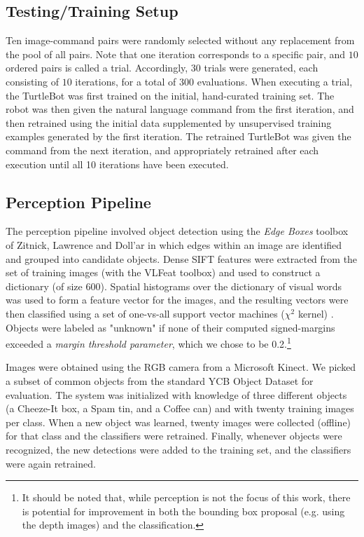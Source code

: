 \subsection{Testing/Training Setup}
Ten image-command pairs were randomly selected without any replacement from the pool of all pairs.
Note that one iteration corresponds to a specific pair, and $10$ ordered pairs is called a trial. 
Accordingly, $30$ trials were generated, each consisting of $10$ iterations, for a total of $300$ evaluations.
When executing a trial, the TurtleBot was first trained on the initial, hand-curated training set.
The robot was then given the natural language command from the first iteration, and then retrained using the initial data supplemented by unsupervised training examples generated by the first iteration.
The retrained TurtleBot was given the command from the next iteration, and appropriately retrained after each execution until all 10 iterations have been executed.

\subsection{Perception Pipeline}
The perception pipeline involved object detection using the \emph{Edge Boxes} toolbox of Zitnick, Lawrence and Doll{'a}r \cite{zitnick2014edge} in which edges within an image are identified and grouped into candidate objects. Dense SIFT features \cite{bosch2007image} were extracted from the set of training images (with the VLFeat \cite{vedaldi2010vlfeat} toolbox) and used to construct a dictionary (of size 600). Spatial histograms over the dictionary of visual words was used to form a feature vector for the images, and the resulting vectors were then classified using a set of one-vs-all support vector machines ($\chi^2$ kernel) \cite{fan2008liblinear}. Objects were labeled as "unknown" if none of their computed signed-margins exceeded a \emph{margin threshold parameter}, which we chose to be 0.2.\footnote{It should be noted that, while perception is not the focus of this work, there is potential for improvement in both the bounding box proposal (e.g. using the depth images) and the classification.}

Images were obtained using the RGB camera from a Microsoft Kinect. We picked a subset of common objects from the standard YCB Object Dataset \cite{calli2015ycb} for evaluation. The system was initialized with knowledge of three different objects (a Cheeze-It box, a Spam tin, and a Coffee can) and with twenty training images per class. When a new object was learned, twenty images were collected (offline) for that class and the classifiers were retrained. Finally, whenever objects were recognized, the new detections were added to the training set, and the classifiers were again retrained.
